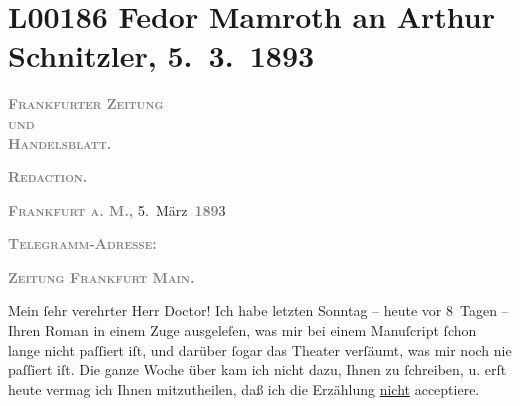 

\section[Fedor Mamroth an Arthur Schnitzler, 5. 3. 1893]{L00186 Fedor Mamroth an Arthur Schnitzler, 5. 3. 1893}
\nopagebreak{}
\rehead{ }\normalsize\beginnumbering{}
\toendnotes[C]{\smallbreak\pagebreak[2]}
\toendnotes[C]{\smallbreak}
\pstart
           {\pb}\textcolor{gray}{\textbf{\textsc{Frankfurter Zeitung}}}{\\}\textsc{\textcolor{gray}{\textbf{und}}}{\\}\textcolor{gray}{\textbf{\textsc{Handelsblatt.}}}\pend
           
\pstart
           
\pstart
           \textcolor{gray}{\textbf{\textsc{Redaction.}}}\pend
           
\pstart
           \raggedleft{}\textcolor{gray}{\textbf{\textsc{Frankfurt a. M.,}}}{ }5. März \textsc{\textcolor{gray}{\textbf{189}}}3\pend
           \pend
           
\pstart
           \textcolor{gray}{\textbf{\textsc{Telegramm-Adresse:}}}\pend
           
\pstart
           \textcolor{gray}{\textbf{\textsc{Zeitung Frankfurt Main.}}}\pend
           
\pstart{}Mein ſehr verehrter Herr Doctor!\pend\vspace{0.5em}
\pstart
           Ich habe letzten Sonntag – heute vor 8 Tagen – Ihren Roman in einem Zuge ausgeleſen, was mir bei
               einem Manuſcript ſchon lange nicht paſſiert iſt, und darüber ſogar das Theater
               verſäumt, was mir noch nie paſſiert iſt. Die ganze Woche über kam ich nicht dazu,
               Ihnen zu ſchreiben, u. erſt heute vermag ich Ihnen mitzutheilen, daß ich die
               Erzählung \uline{nicht} acceptiere.\pend
           
